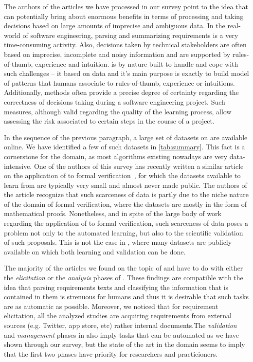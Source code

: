 The authors of the articles we have processed in our survey point
to the idea that \ML can potentially bring about enormous benefits in terms of
processing and taking decisions based on  large amounts of imprecise and
ambiguous data. In the real-world of software
engineering, parsing and summarizing requirements is a very time-consuming
activity. Also, decisions taken by technical stakeholders are often based on imprecise,
incomplete and noisy information and are supported by rules-of-thumb, experience
and intuition. \ML is by nature built to handle and cope with such challenges
-- it based on data and it's main purpose is exactly to build model of patterns
that humans associate to rules-of-thumb, experience or intuitions. Additionally,
\ML methods often provide a precise degree of certainty regarding the
correctness of decisions taking during a software engineering project. Such
measures, although valid regarding the quality of the learning process, allow
assessing the risk associated to certain steps in the course of a project.

In the sequence of the previous paragraph, a large set of datasets
on \RE are available online. We have identified a few of such datasets in
\tab \ref{tab:summary}. This fact is a cornerstone for the domain, as most \ML
algorithms existing nowadays are very data-intensive. One of the authors of this
survey has recently written a similar article on the application of \ML to
formal verification~\cite{AmLuBi:2018}, for which the datasets available
to learn from are typically very small and almost never made public. The authors
of the article recognize that such scarceness of data is partly due to the niche
nature of the domain of formal verification, where the datasets are mostly in
the form of mathematical proofs. Nonetheless, and in spite of the large body of
work regarding the application of \ML to formal verification, such scarceness of
data poses a problem not only to the automated learning, but also to the
scientific validation of such proposals. This is not the case in \RE, where many
datasets are publicly available on which both learning and validation can be
done.

The majority of the articles we found on the topic of \ML and \RE have to do
with either the \emph{elicitation} or the \emph{analysis} phases of \RE. These
findings are compatible with the idea that parsing requirements texts and
classifying the information that is contained in them is strenuous for humans
and thus it is desirable that such tasks are as automatic as possible. Moreover, we noticed that for requirement elicitation, all the analyzed studies are acquiring requirements from external sources (e.g. Twitter, app store, etc) rather internal documents.The
\emph{validation} and \emph{management} phases in \RE also imply tasks that can
be automated as we have shown through our survey, but the state of the art in
the domain seems to imply that the first two phases have priority for
researchers and practicioners.

